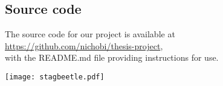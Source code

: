 \documentclass[nofilelist]{cslthse-msc}
\begin{document}
\begin{appendices} %
\chapter{Source code}
The source code for our project is available at \\\url{https://github.com/nichobi/thesis-project}, \\with the README.md file providing instructions for use.

\vspace*{\fill}
\hspace*{\fill}
\texttt{[image: stagbeetle.pdf]}

\printfilelist

%
\end{appendices}
\end{document}
